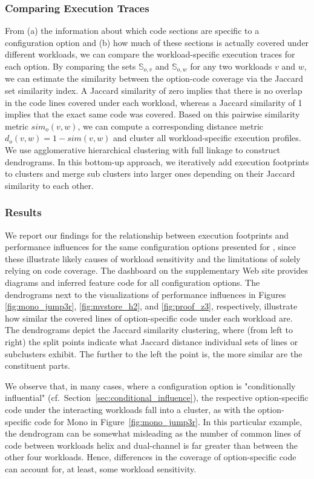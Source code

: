 {{{\subsubsection{Comparing Execution Traces}
From (a) the information about which code sections are specific to a configuration option and (b) how much of these sections is actually covered under different workloads, we can compare the workload-specific execution traces for each option. By comparing the sets $\mathbb{S}_{o, v}$ and $\mathbb{S}_{o, w}$ for any two workloads $v$ and $w$, we can estimate the similarity between the option-code coverage via the Jaccard set similarity index. A Jaccard similarity of zero implies that there is no overlap in the code lines covered under each workload, whereas a Jaccard similarity of 1 implies that the exact same code was covered. Based on this pairwise similarity metric $sim_o(v, w)$, we can compute a corresponding distance metric $d_o(v, w) = 1 - sim(v, w)$ and cluster all workload-specific execution profiles. 
We use agglomerative hierarchical clustering with full linkage to construct dendrograms. In this bottom-up approach, we iteratively add execution footprints to clusters and merge sub clusters into larger ones depending on their Jaccard similarity  to each other. 

\subsubsection{Results}\label{sec:results3}
We report our findings for the relationship between execution footprints and performance influences for the same configuration options presented for , since these illustrate likely causes of workload sensitivity and the limitations of solely relying on code coverage. The dashboard on the supplementary Web site provides diagrams and inferred feature code for all configuration options. The dendrograms next to the visualizations of performance influences in Figures \ref{fig:mono_jump3r}, \ref{fig:mvstore_h2}, and \ref{fig:proof_z3}, respectively, illustrate how similar the covered lines of option-specific code under each workload are. 
The dendrograms depict the Jaccard similarity clustering, where (from left to right) the split points indicate what Jaccard distance individual sets of lines or subclusters exhibit. The further to the left the point is, the more similar are the constituent parts.

We  observe that, in many cases, where  a configuration option is "conditionally influential" (cf.~Section~\ref{sec:conditional_influence}), the respective option-specific code under the interacting workloads fall into a cluster, as with the option-specific code for \textsf{Mono} in Figure~\ref{fig:mono_jump3r}. In this particular example, the dendrogram can be somewhat misleading as the number of common lines of code between workloads helix and dual-channel is far greater than between the other four workloads. Hence, differences in the coverage of option-specific code can account for, at least, some workload sensitivity.

}}}
